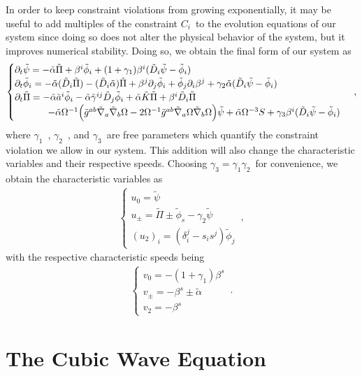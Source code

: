 In order to keep constraint violations from growing exponentially, it may be useful to add multiples of the constraint $C_i$~to the evolution equations of our system since doing so does not alter the physical behavior of the system, but it improves numerical stability. Doing so, we obtain the final form of our system as
%
\begin{align}
    \begin{cases}
        \partial_t \tilde{\psi} = - \tilde{\alpha} \tilde{\Pi} + \beta^i \tilde{\phi}_i + (1 + \gamma_1) \beta^i (\tilde{D}_i \tilde{\psi} - \tilde{\phi}_i) \\
        \partial_t \tilde{\phi}_i = - \tilde{\alpha} (\tilde{D}_i \tilde{\Pi}) - (\tilde{D}_i \tilde{\alpha}) \tilde{\Pi} + \beta^j \partial_j \tilde{\phi}_i + \tilde{\phi}_j \partial_i \beta^j + \gamma_2 \tilde{\alpha} (\tilde{D}_i \tilde{\psi} - \tilde{\phi}_i) \\
        \partial_t \tilde{\Pi} = - \tilde{\alpha} \tilde{a}^i \tilde{\phi}_i - \tilde{\alpha} \tilde{\gamma}^{ij} \tilde{D}_j \tilde{\phi}_i + \tilde{\alpha} \tilde{K} \tilde{\Pi} + \beta^i \tilde{D}_i \tilde{\Pi} \\
        \hspace{3.5em} - \tilde{\alpha} \Omega^{-1} \Big( \tilde{g}^{ab} \tilde{\nabla}_a \tilde{\nabla}_b \Omega - 2 \Omega^{-1} \tilde{g}^{ab} \tilde{\nabla}_a \Omega \tilde{\nabla}_b \Omega \Big) \tilde{\psi} + \tilde{\alpha} \Omega^{-3} S + \gamma_3 \beta^i (\tilde{D}_i \tilde{\psi} - \tilde{\phi}_i)
    \end{cases}\,,
    \label{eq:wave_equation_constraint_violation}
\end{align}
%
where $\gamma_1$~, $\gamma_2$~, and $\gamma_3$~are free parameters which quantify the constraint violation we allow in our system. This addition will also change the characteristic variables and their respective speeds. Choosing $\gamma_3 = \gamma_1 \gamma_2$~for convenience, we obtain the characteristic variables as
%
\begin{align}
    \begin{cases}
        u_0 = \tilde{\psi} \\
        u_\pm = \tilde{\Pi} \pm \tilde{\phi}_s - \gamma_2 \tilde{\psi} \\
        (u_2)_i = (\delta_i^j - s_i s^j) \tilde{\phi}_j
    \end{cases}\,,
\end{align}
%
with the respective characteristic speeds being
%
\begin{align}
    \begin{cases}
        v_0 = - (1 + \gamma_1) \beta^s \\
        v_\pm = -\beta^s \pm \tilde{\alpha} \\
        v_2 = -\beta^s
    \end{cases}\,.
\end{align}


\section{The Cubic Wave Equation}
\label{section:cubic_wave_equation}